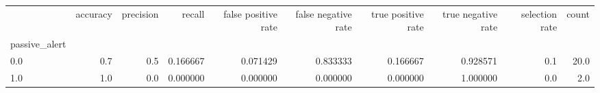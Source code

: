 \begin{tabular}{lrrrrrrrrr}
\toprule
{} &  accuracy &  precision &    recall &  false positive rate &  false negative rate &  true positive rate &  true negative rate &  selection rate &  count \\
passive\_alert &           &            &           &                      &                      &                     &                     &                 &        \\
\midrule
0.0           &       0.7 &        0.5 &  0.166667 &             0.071429 &             0.833333 &            0.166667 &            0.928571 &             0.1 &   20.0 \\
1.0           &       1.0 &        0.0 &  0.000000 &             0.000000 &             0.000000 &            0.000000 &            1.000000 &             0.0 &    2.0 \\
\bottomrule
\end{tabular}
